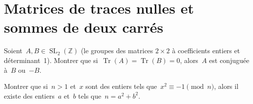 
\section{Matrices de traces nulles et sommes de deux carrés}

Soient~$A, B \in \operatorname{SL}_2(\mathbb{Z})$ (le groupes des matrices $2\times 2$ à coefficients entiers et déterminant~1).
Montrer que si~$\operatorname{Tr}(A) = \operatorname{Tr}(B) = 0$, alors~$A$ est conjuguée à~$B$ ou~$-B$.

Montrer que si~$n > 1$ et~$x$ sont des entiers tels que~$x^2 \equiv -1 \pmod{n}$, alors il existe des entiers~$a$ et~$b$ tels que~$n = a^2 + b^2$.

